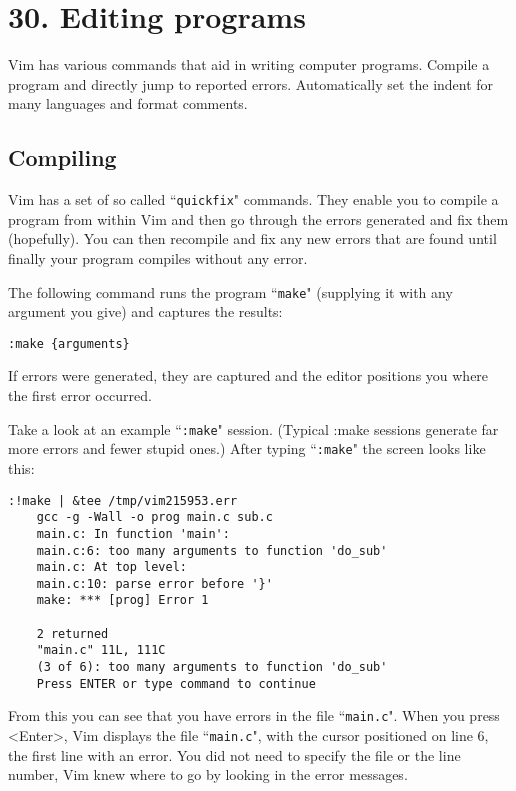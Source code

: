 \section{30. Editing programs}
Vim has various commands that aid in writing computer programs.
Compile a program and directly jump to reported errors.
Automatically set the indent for many languages and format comments.
\localtableofcontents
\subsection{Compiling}
Vim has a set of so called ``\texttt{quickfix}" commands.
They enable you to compile a program from within Vim and then go through the errors generated and fix them (hopefully).
You can then recompile and fix any new errors that are found until finally your program compiles without any error.

The following command runs the program ``\texttt{make}" (supplying it with any argument you give) and captures the results:

\begin{Verbatim}[samepage=true]
 :make {arguments}
\end{Verbatim}

If errors were generated, they are captured and the editor positions you where the first error occurred.

Take a look at an example ``\texttt{:make}" session.
(Typical :make sessions generate far more errors and fewer stupid ones.)  After typing ``\texttt{:make}" the screen looks like this:

\begin{Verbatim}[samepage=true]
    :!make | &tee /tmp/vim215953.err 
    gcc -g -Wall -o prog main.c sub.c 
    main.c: In function 'main': 
    main.c:6: too many arguments to function 'do_sub' 
    main.c: At top level: 
    main.c:10: parse error before '}' 
    make: *** [prog] Error 1 

    2 returned 
    "main.c" 11L, 111C 
    (3 of 6): too many arguments to function 'do_sub' 
    Press ENTER or type command to continue 
\end{Verbatim}

From this you can see that you have errors in the file ``\texttt{main.c}".
When you press <Enter>, Vim displays the file ``\texttt{main.c}", with the cursor positioned on line 6, the first line with an error.
You did not need to specify the file or the line number, Vim knew where to go by looking in the error messages.

